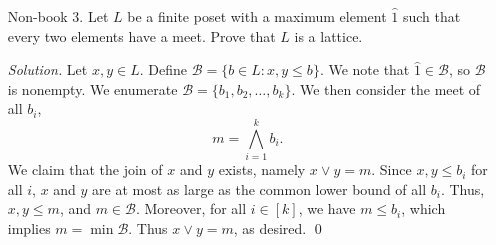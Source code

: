 \documentclass[11pt,letterpaper]{article}
\newenvironment{solution}{\color{Violet}\textit{Solution.}}{\color{black}}
\begin{document}
\begin{enumerate}
    \item[Non-book 3.] Let $L$ be a finite poset with a maximum element $\hat{1}$ such that every two elements have a meet. Prove that $L$ is a lattice.
    
    \begin{solution}
        Let $x,y \in L$. Define $\mathcal{B} = \{b \in L \colon x,y \leq b\}$. We note that $\hat{1} \in \mathcal{B}$, so $\mathcal{B}$ is nonempty. We enumerate $\mathcal{B} = \{b_1,b_2,\dots,b_k\}$. We then consider the meet of all $b_i$,
        \[
        m = \bigwedge_{i=1}^k b_i.
        \]
        We claim that the join of $x$ and $y$ exists, namely $x\vee y = m$. Since $x,y \leq b_i$ for all $i$, $x$ and $y$ are at most as large as the common lower bound of all $b_i$. Thus, $x,y \leq m$, and $m \in \mathcal{B}$. Moreover, for all $i \in [k]$, we have $m \leq b_i$, which implies $m = \min \mathcal{B}$. Thus $x\vee y = m$, as desired. \qed
    \end{solution}

\end{enumerate}
\end{document}
